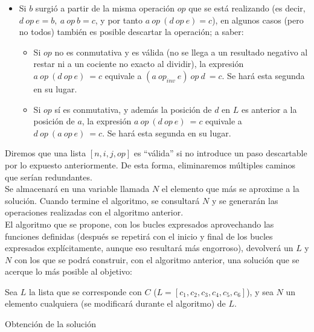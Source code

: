 \begin{itemize}
	\item Si $b$ surgió a partir de la misma operación $op$ que se está realizando
	(es decir, $d\ op\ e = b,\ a\ op\ b = c$, y por tanto $a\ op\ (d\ op\ e) = c$),
	 en algunos casos (pero no todos) también es posible descartar la operación;
	 a saber:
	\begin{itemize}
		\item Si $op$ no es conmutativa y es válida (no se llega a un resultado
		negativo al restar ni a un cociente no exacto al dividir), la expresión
		$a\ op\ (d\ op\ e)\ = c$ equivale a $(a\ op_{inv}\ e)\ op\ d\ = c$.
		Se hará esta segunda en su lugar.
		\item Si $op$ sí es conmutativa, y además la posición de $d$ en $L$ es
		anterior a la posición de $a$, la expresión $a\ op\ (d\ op\ e)\ = c$
		equivale a $d\ op\ (a\ op\ e)\ = c$. Se hará esta segunda en su lugar.
	\end{itemize}
\end{itemize}

Diremos que una lista $[n, i, j, op]$ es ``válida'' si no introduce un paso
descartable por lo expuesto anteriormente. De esta forma, eliminaremos múltiples
 caminos que serían redundantes.\\

Se almacenará en una variable llamada $N$ el elemento que más se aproxime a la
solución. Cuando termine el algoritmo, se consultará $N$ y se generarán las
operaciones realizadas con el algoritmo anterior. \\


El algoritmo que se propone, con los bucles expresados aprovechando las
funciones definidas (después se repetirá con el inicio y final de los bucles
expresados explícitamente, aunque eso resultará más engorroso), devolverá un
$L$ y $N$ con los que se podrá construir, con el algoritmo anterior, una
solución que se acerque lo más posible al objetivo:\\

\begin{algorithm}[H]
Sea $L$ la lista que se corresponde con
$C$ ($L = [c_1, c_2, c_3, c_4, c_5, c_6]$), y sea $N$ un elemento cualquiera
(se modificará durante el algoritmo) de $L$.\\
\caption{Obtención de la solución}
\end{algorithm}


